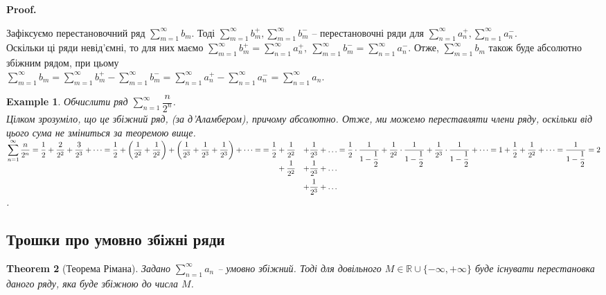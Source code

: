 \documentclass[a4paper, 10pt]{article}
\makeatletter
\def\huge{\displaystyle}
\def\qed{$\blacksquare$}
\theoremstyle{theoremdd}
\newtheorem{theorem}{Theorem}[subsection]
\theoremstyle{theoremdd}
\theoremstyle{theoremdd}
\theoremstyle{theoremdd}
\theoremstyle{theoremdd}
\newtheorem{example}[theorem]{Example}
\theoremstyle{theoremdd}
\theoremstyle{theoremdd}
\theoremstyle{theoremdd}
\theoremstyle{theoremdd}
\renewenvironment{proof}[1][Proof.\\]{\par
\pushQED{\hfill \qed}%
\normalfont \topsep6\p@\@plus6\p@\relax
\trivlist
\item\relax
{\bfseries
#1\@addpunct{.}}\hspace\labelsep\ignorespaces
}{%
\popQED\endtrivlist\@endpefalse
}
\makeatother
\begin{document}
\begin{proof}
Зафіксуємо перестановочний ряд $\displaystyle\sum_{m=1}^\infty b_m$. Тоді $\displaystyle\sum_{m=1}^\infty b_m^+, \sum_{m=1}^\infty b_m^-$ -- перестановочні ряди для $\displaystyle\sum_{n=1}^\infty a_n^+,\sum_{n=1}^\infty a_n^-$.\\
Оскільки ці ряди невід'ємні, то для них маємо $\displaystyle\sum_{m=1}^\infty b_m^+ = \sum_{n=1}^\infty a_n^+,\ \sum_{m=1}^\infty b_m^- = \sum_{n=1}^\infty a_n^-$. Отже, $\displaystyle\sum_{m=1}^\infty b_m$ також буде абсолютно збіжним рядом, при цьому\\
$\displaystyle\sum_{m=1}^\infty b_m = \sum_{m=1}^\infty b_m^+ - \sum_{m=1}^\infty b_m^- = \sum_{n=1}^\infty a_n^+ - \sum_{n=1}^\infty a_n^- = \sum_{n=1}^\infty a_n$.
\end{proof}

\begin{example}
Обчислити ряд $\displaystyle\sum_{n=1}^\infty \dfrac{n}{2^n}$.\\
Цілком зрозуміло, що це збіжний ряд, (за д'Аламбером), причому абсолютно. Отже, ми можемо переставляти члени ряду, оскільки від цього сума не зміниться за теоремою вище.\\
$\displaystyle\sum_{n=1}^\infty \dfrac{n}{2^n} = \dfrac{1}{2} + \dfrac{2}{2^2} + \dfrac{3}{2^3} + \dots = \dfrac{1}{2} + \left( \dfrac{1}{2^2} + \dfrac{1}{2^2} \right) + \left( \dfrac{1}{2^3} + \dfrac{1}{2^3} + \dfrac{1}{2^3} \right) + \dots = \\
\begin{aligned}[t]
= \dfrac{1}{2} & + \dfrac{1}{2^2} & + \dfrac{1}{2^3} + \dots \\
& + \dfrac{1}{2^2} & + \dfrac{1}{2^3} + \dots \\
& & + \dfrac{1}{2^3} + \dots
\end{aligned} \\
 = \dfrac{1}{2} \cdot \dfrac{1}{1-\dfrac{1}{2}} + \dfrac{1}{2^2} \cdot \dfrac{1}{1-\dfrac{1}{2}} + \dfrac{1}{2^3} \cdot \dfrac{1}{1-\dfrac{1}{2}} + \dots = 1 + \dfrac{1}{2} + \dfrac{1}{2^2} + \dots = \dfrac{1}{1-\dfrac{1}{2}} = 2$.
\end{example}

\subsection{Трошки про умовно збіжні ряди}
\begin{theorem}[Теорема Рімана]
Задано $\huge \sum_{n=1}^\infty a_n$ -- умовно збіжний. Тоді для довільного $M \in \mathbb{R} \cup \{-\infty, +\infty\}$ буде існувати перестановка даного ряду, яка буде збіжною до числа $M$.
\end{theorem}
\end{document}
